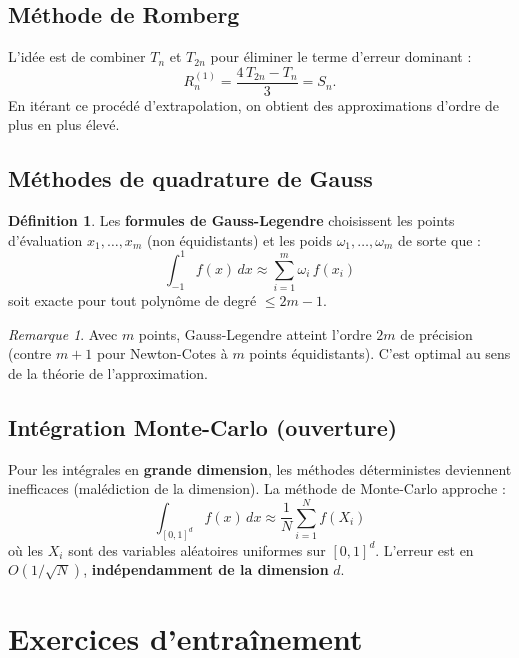 \documentclass[a4paper,12pt]{article}
\theoremstyle{definition}
\newtheorem{definition}{Définition}[section]
\theoremstyle{plain}
\theoremstyle{remark}
\newtheorem{remarque}{Remarque}[section]
\begin{document}
\subsection{Méthode de Romberg}

L'idée est de combiner $T_n$ et $T_{2n}$ pour éliminer le terme d'erreur dominant :
\[
  R_n^{(1)} = \frac{4\,T_{2n} - T_n}{3} = S_n.
\]
En itérant ce procédé d'extrapolation, on obtient des approximations d'ordre de plus en plus élevé.

\subsection{Méthodes de quadrature de Gauss}

\begin{definition}
Les \textbf{formules de Gauss-Legendre} choisissent les points d'évaluation $x_1, \ldots, x_m$ (non équidistants) et les poids $\omega_1, \ldots, \omega_m$ de sorte que :
\[
  \int_{-1}^1 f(x)\,dx \approx \sum_{i=1}^m \omega_i\,f(x_i)
\]
soit exacte pour tout polynôme de degré $\leq 2m-1$.
\end{definition}

\begin{remarque}
Avec $m$ points, Gauss-Legendre atteint l'ordre $2m$ de précision (contre $m+1$ pour Newton-Cotes à $m$ points équidistants). C'est optimal au sens de la théorie de l'approximation.
\end{remarque}

\subsection{Intégration Monte-Carlo (ouverture)}

Pour les intégrales en \textbf{grande dimension}, les méthodes déterministes deviennent inefficaces (malédiction de la dimension). La méthode de Monte-Carlo approche :
\[
  \int_{[0,1]^d} f(x)\,dx \approx \frac{1}{N}\sum_{i=1}^N f(X_i)
\]
où les $X_i$ sont des variables aléatoires uniformes sur $[0,1]^d$. L'erreur est en $O(1/\sqrt{N})$, \textbf{indépendamment de la dimension} $d$.

\section{Exercices d'entraînement}
\end{document}
